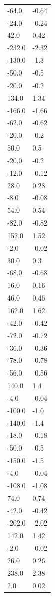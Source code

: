 \begin{longtable}{ll}
-64.0 & -0.64 \\
-24.0 & -0.24 \\
42.0 & 0.42 \\
-232.0 & -2.32 \\
-130.0 & -1.3 \\
-50.0 & -0.5 \\
-20.0 & -0.2 \\
134.0 & 1.34 \\
-166.0 & -1.66 \\
-62.0 & -0.62 \\
-20.0 & -0.2 \\
50.0 & 0.5 \\
-20.0 & -0.2 \\
-12.0 & -0.12 \\
28.0 & 0.28 \\
-8.0 & -0.08 \\
54.0 & 0.54 \\
-82.0 & -0.82 \\
152.0 & 1.52 \\
-2.0 & -0.02 \\
30.0 & 0.3 \\
-68.0 & -0.68 \\
16.0 & 0.16 \\
46.0 & 0.46 \\
162.0 & 1.62 \\
-42.0 & -0.42 \\
-72.0 & -0.72 \\
-36.0 & -0.36 \\
-78.0 & -0.78 \\
-56.0 & -0.56 \\
140.0 & 1.4 \\
-4.0 & -0.04 \\
-100.0 & -1.0 \\
-140.0 & -1.4 \\
-18.0 & -0.18 \\
-50.0 & -0.5 \\
-150.0 & -1.5 \\
-4.0 & -0.04 \\
-108.0 & -1.08 \\
74.0 & 0.74 \\
-42.0 & -0.42 \\
-202.0 & -2.02 \\
142.0 & 1.42 \\
-2.0 & -0.02 \\
26.0 & 0.26 \\
238.0 & 2.38 \\
2.0 & 0.02 \\

\end{longtable}
